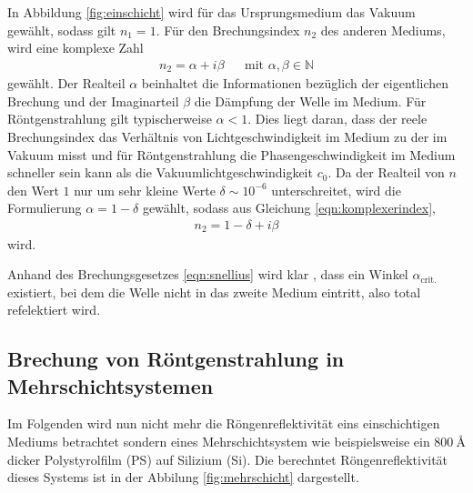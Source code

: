 In Abbildung \ref{fig:einschicht} wird für das Ursprungsmedium das Vakuum gewählt,
sodass gilt $n_{1} = 1$. Für den Brechungsindex $n_{2}$ des anderen Mediums,
wird eine komplexe Zahl
\begin{align}
  n_{2} = \alpha + i \beta& &\text{mit } \alpha, \beta \in \mathbb{N}
  \label{eqn:komplexerindex}
\end{align}
gewählt. Der Realteil $\alpha$ beinhaltet die Informationen bezüglich der eigentlichen
Brechung und der Imaginarteil $\beta$ die Dämpfung der Welle im Medium. Für Röntgenstrahlung
gilt typischerweise $\alpha < 1$. Dies liegt daran, dass der reele
Brechungsindex das Verhältnis von Lichtgeschwindigkeit im Medium zu der im Vakuum
misst und für Röntgenstrahlung die Phasengeschwindigkeit im Medium
schneller sein kann als die Vakuumlichtgeschwindigkeit $c_{0}$.
Da der Realteil von $n$ den Wert $1$ nur um sehr kleine Werte
$\delta \sim 10^{-6}$ unterschreitet, wird die Formulierung
$\alpha = 1 - \delta$ gewählt,
sodass aus Gleichung \eqref{eqn:komplexerindex},
\begin{align}
  n_{2} = 1 - \delta + i \beta
  \label{eqn:komplexerindexdelta}
\end{align}
wird.

Anhand des Brechungsgesetzes \eqref{eqn:snellius} wird klar , dass ein Winkel
$\alpha_\text{{crit.}}$ existiert, bei dem die Welle nicht in das
zweite Medium eintritt, also total refelektiert wird.




\subsection{Brechung von Röntgenstrahlung in Mehrschichtsystemen}
\label{subsec:mehrschicht}
Im Folgenden wird nun nicht mehr 
die Röngenreflektivität
eins einschichtigen 
Mediums betrachtet sondern eines Mehrschichtsystem wie 
beispielsweise ein $\SI{800}{\angstrom}$ dicker Polystyrolfilm (PS) 
auf Silizium (Si). Die berechntet Röngenreflektivität dieses 
Systems ist in der Abbilung \ref{fig:mehrschicht} dargestellt. 

